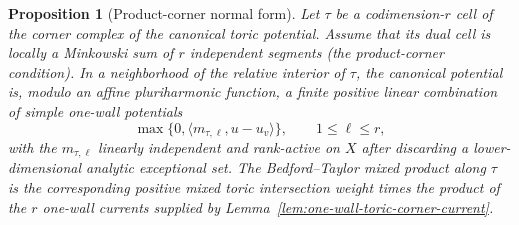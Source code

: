 \documentclass[10pt,a4paper]{amsart}
\theoremstyle{plain}
\newtheorem{proposition}[theorem]{Proposition}
\theoremstyle{plain}
\numberwithin{equation}{section}
\begin{document}
\begin{proposition}[Product-corner normal form]
	\label{prop:simple-mixed-corner-normal-form}
	\label{input:simple-mixed-corner-normal-form}
	Let \(\tau\) be a codimension-\(r\) cell of the corner complex of the
	canonical toric potential.  Assume that its dual cell is locally a Minkowski
	sum of \(r\) independent segments (the product-corner condition).  In a
	neighborhood of the relative interior of \(\tau\), the canonical potential is,
	modulo an affine pluriharmonic function, a finite positive linear combination
	of simple one-wall potentials
	\[
	\max\{0,\langle m_{\tau,\ell},u-u_v\rangle\},
	\qquad 1\le \ell\le r,
	\]
	with the \(m_{\tau,\ell}\) linearly independent and rank-active on \(X\) after
	discarding a lower-dimensional analytic exceptional set.  The Bedford--Taylor
	mixed product along \(\tau\) is the corresponding positive mixed toric
	intersection weight times the product of the \(r\) one-wall currents supplied
	by Lemma~\ref{lem:one-wall-toric-corner-current}.
\end{proposition}
\end{document}
